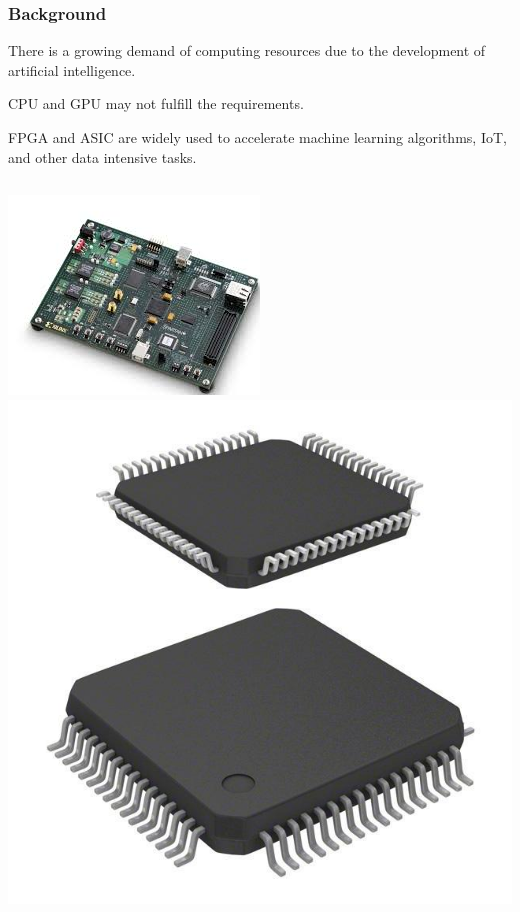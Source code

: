 \documentclass[12pt,beamer]{beamer}
\begin{document}
\begin{frame}
	\frametitle{Background}
	There is a growing demand of computing resources due to the development of artificial intelligence.
	
	CPU and GPU may not fulfill the requirements.
	
	FPGA and ASIC are widely used to accelerate machine learning algorithms, IoT, and other data intensive tasks.


	\vspace{10pt}	
	\begin{columns}[T]
		\includegraphics[width=\textwidth]{pic/circuit1.jpeg}
		\includegraphics[width=\textwidth]{pic/circuit2.jpg}
	\end{columns}
	
\end{frame}
\end{document}
